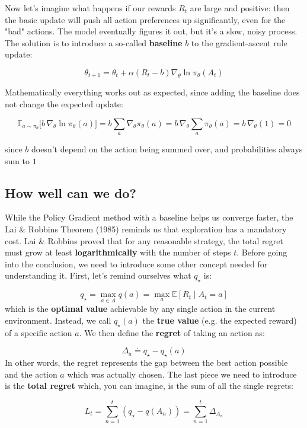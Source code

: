 \begin{tcolorbox}[colframe=black, coltitle=white, title=Function Approximation Primers, fonttitle=\bfseries]
Now let's imagine what happens if our rewards $R_t$ are large and positive: then the basic update will push all action preferences up significantly, even for the "bad" actions. The model eventually figures it out, but it's a slow, noisy process. The solution is to introduce a so-called \textbf{baseline} $b$ to the gradient-ascent rule update:

\[
    \theta_{t+1} = \theta_t + \alpha (R_t - b) \nabla_\theta \ln \pi_\theta (A_t)
\]

Mathematically everything works out as expected, since adding the baseline does not change the expected update:

$$\mathbb{E}_{a\sim\pi_\theta}\big[b\,\nabla_\theta \ln \pi_\theta(a)\big] =
b\sum_a \nabla_\theta \pi_\theta(a) = b\,\nabla_\theta\sum_a \pi_\theta(a) = b\,\nabla_\theta(1) = 0$$

since $b$ doesn't depend on the action being summed over, and probabilities always sum to $1$
\end{tcolorbox}



\subsection{How well can we do?}
While the Policy Gradient method with a baseline helps us converge faster, the Lai \& Robbins Theorem (1985) reminds us that exploration has a mandatory cost. Lai \& Robbins proved that for any reasonable strategy, the total regret must grow at least \textbf{logarithmically} with the number of steps $t$. Before going into the conclusion, we need to introduce some other concept needed for understanding it. First, let's remind ourselves what $q_\star$ is:

\[
    q_\star = \max_{a \in A} q(a) = \max_{a} \mathbb{E}[R_t \mid A_t = a]
\]
which is the \textbf{optimal value} achievable by any single action in the current environment. Instead, we call $q_\star(a)$ the \textbf{true value} (e.g. the expected reward) of a specific action $a$. We then define the \textbf{regret} of taking an action as:

\[
    \Delta_a \doteq q_\star - q_\star(a) 
\]
In other words, the regret represents the gap between the best action possible and the action $a$ which was actually chosen. The last piece we need to introduce is the \textbf{total regret} which, you can imagine, is the sum of all the single regrets:

\[
    L_t = \sum_{n=1}^{t} \left( q_\star - q(A_n) \right) = \sum_{n=1}^t \Delta_{A_n}
\]


